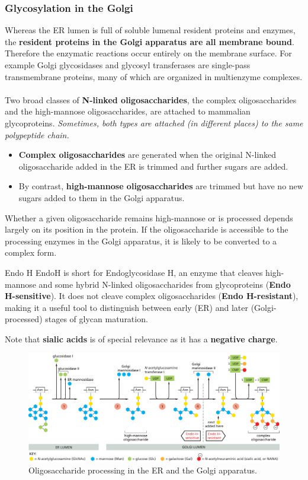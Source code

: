 \documentclass[../main.tex]{subfiles}
\begin{document}
\subsubsection{Glycosylation in the Golgi}
Whereas the ER lumen is full of soluble lumenal resident proteins and enzymes, the \textbf{resident proteins in the Golgi apparatus are all membrane bound}. Therefore the enzymatic reactions occur entirely on the membrane surface. For example Golgi glycosidases and glycosyl transferases are single-pass transmembrane proteins, many of which are organized in multienzyme complexes.\\
\\
Two broad classes of \textbf{N-linked oligosaccharides}, the complex oligosaccharides and the high-mannose oligosaccharides, are attached to mammalian glycoproteins. \textit{Sometimes, both types are attached (in different places) to the same polypeptide chain.} 
\begin{itemize}
	\item \textbf{Complex oligosaccharides} are generated when the original N-linked oligosaccharide added in the ER is trimmed and further sugars are added.
	\item By contrast, \textbf{high-mannose oligosaccharides} are trimmed but have no new sugars added to them in the Golgi apparatus.
\end{itemize}

Whether a given oligosaccharide remains high-mannose or is processed depends largely on its position in the protein. If the oligosaccharide is accessible to the processing enzymes in the Golgi apparatus, it is likely to be converted to a complex form. 

\begin{RemarkWithTitel}{Endo H} 
	\gls{EndoH}  is short  for Endoglycosidase H, an enzyme that cleaves high-mannose and some hybrid N-linked oligosaccharides from glycoproteins (\textbf{Endo H-sensitive}). It does not cleave complex oligosaccharides (\textbf{Endo H-resistant}), making it a useful tool to distinguish between early (ER) and later (Golgi-processed) stages of glycan maturation.
\end{RemarkWithTitel}
Note that \textbf{sialic acids} is of special relevance as it has a \textbf{negative charge}.

\begin{figure}[H]
	\centering
	\includegraphics[width= \textwidth]{23}
	\caption{Oligosaccharide processing in the ER and the Golgi apparatus.}
\end{figure}
\end{document}
